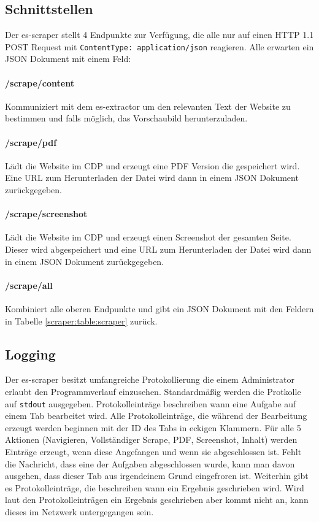 \subsection{Schnittstellen}
Der es-scraper stellt 4 Endpunkte zur Verfügung, die alle nur auf einen HTTP 1.1 POST Request mit \verb|ContentType: application/json| reagieren. Alle erwarten ein JSON Dokument mit einem  Feld: 
\paragraph{/scrape/content} Kommuniziert mit dem es-extractor um den relevanten Text der Website zu bestimmen und falls möglich, das Vorschaubild herunterzuladen. 
\paragraph{/scrape/pdf} Lädt die Website im CDP und erzeugt eine PDF Version die gespeichert wird. Eine URL zum Herunterladen der Datei wird dann in einem JSON Dokument zurückgegeben.
\paragraph{/scrape/screenshot} Lädt die Website im CDP und erzeugt einen Screenshot der gesamten Seite. Dieser wird abgespeichert und eine URL zum Herunterladen der Datei wird dann in einem JSON Dokument zurückgegeben.
\paragraph{/scrape/all} Kombiniert alle oberen Endpunkte und gibt ein JSON Dokument mit den Feldern in Tabelle \ref{scraper:table:scraper} zurück.
 
\subsection{Logging}
Der es-scraper besitzt umfangreiche Protokollierung die einem Administrator erlaubt den Programmverlauf einzusehen. Standardmäßig werden die Protkolle auf \verb|stdout| ausgegeben. Protokolleinträge beschreiben wann eine Aufgabe auf einem Tab bearbeitet wird. Alle Protokolleinträge, die während der Bearbeitung erzeugt werden beginnen mit der ID des Tabs in eckigen Klammern. Für alle 5 Aktionen (Navigieren, Vollständiger Scrape, PDF, Screenshot, Inhalt) werden Einträge erzeugt, wenn diese Angefangen und wenn sie abgeschlossen ist. Fehlt die Nachricht, dass eine der Aufgaben abgeschlossen wurde, kann man davon ausgehen, dass dieser Tab aus irgendeinem Grund eingefroren ist. Weiterhin gibt es Protokolleinträge, die beschreiben wann ein Ergebnis geschrieben wird. Wird laut den Protokolleinträgen ein Ergebnis geschrieben aber kommt nicht an, kann dieses im Netzwerk untergegangen sein.


